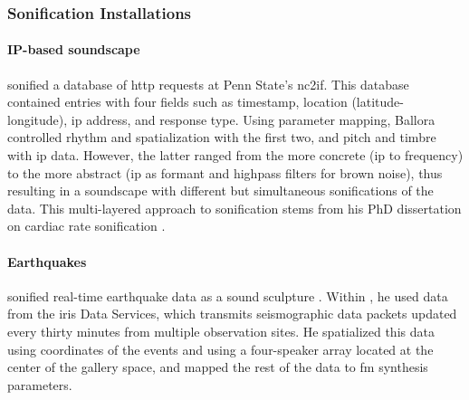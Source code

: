 \subsubsection{Sonification Installations}
\label{sonification:installations}

% 
% 

\paragraph{IP-based soundscape}
\citeauthor{icmc/bbp2372.2010.117} \parencite{icmc/bbp2372.2010.117} sonified a database of \gls{http} requests at Penn State's \gls{nc2if}. This database contained entries with four fields such as timestamp, location (latitude-longitude), \gls{ip} address, and response type. Using parameter mapping, Ballora controlled rhythm and spatialization with the first two, and pitch and timbre with \gls{ip} data. However, the latter ranged from the more concrete (\gls{ip} to frequency) to the more abstract (\gls{ip} as formant and highpass filters for brown noise), thus resulting in a soundscape with different but simultaneous sonifications of the data. This multi-layered approach to sonification stems from his PhD dissertation on cardiac rate sonification \parencite{Ballora/2000/phdthesis}.

\paragraph{Earthquakes}
\citeauthor{icmc/bbp2372.2017.033} sonified real-time earthquake data as a sound sculpture \parencite{icmc/bbp2372.2017.033}. Within , he used data from the \gls{iris} Data Services, which transmits seismographic data packets updated every thirty minutes from multiple observation sites. He spatialized this data using coordinates of the events and using a four-speaker array located at the center of the gallery space, and mapped the rest of the data to \gls{fm} synthesis parameters.

